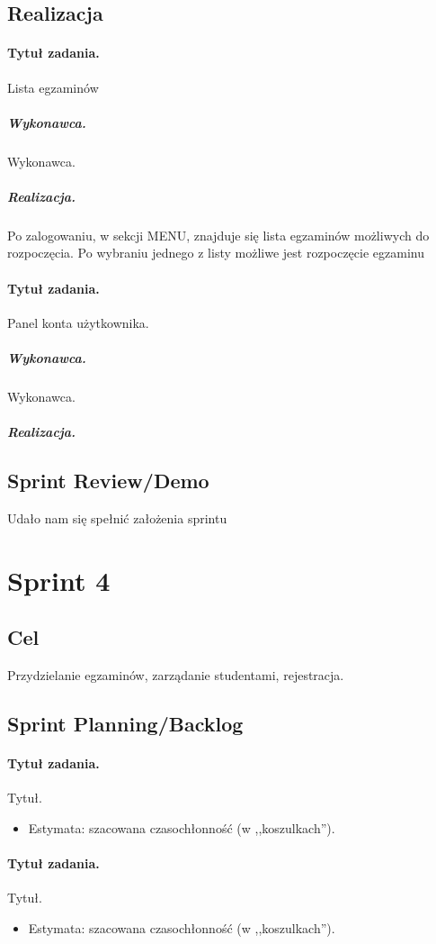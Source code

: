 \documentclass[a4paper]{article}
\begin{document}
\subsection{Realizacja}

\paragraph{Tytuł zadania.}  Lista egzaminów
\subparagraph{Wykonawca.} Wykonawca.
\subparagraph{Realizacja.} Po zalogowaniu, w sekcji MENU, znajduje się lista egzaminów możliwych do rozpoczęcia. Po wybraniu jednego z listy możliwe jest rozpoczęcie egzaminu

\paragraph{Tytuł zadania.} Panel konta użytkownika.
\subparagraph{Wykonawca.} Wykonawca.
\subparagraph{Realizacja.} 
 


\subsection{Sprint Review/Demo}
Udało nam się spełnić założenia sprintu

\section{Sprint 4}

\subsection{Cel} Przydzielanie egzaminów, zarządanie studentami, rejestracja. 

\subsection{Sprint Planning/Backlog}

\paragraph{Tytuł zadania.} Tytuł.
\begin{itemize}
\item Estymata: szacowana czasochłonność (w ,,koszulkach'').
\end{itemize}

\paragraph{Tytuł zadania.} Tytuł.
\begin{itemize}
\item Estymata: szacowana czasochłonność (w ,,koszulkach'').
\end{itemize}
\end{document}
